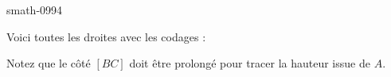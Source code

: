 
\begin{corrige}{smath-0994}

Voici toutes les droites avec les codages :
\begin{center}
   
\end{center}
Notez que le côté \( [BC]\) doit être prolongé pour tracer la hauteur issue de \( A\).

\end{corrige}
